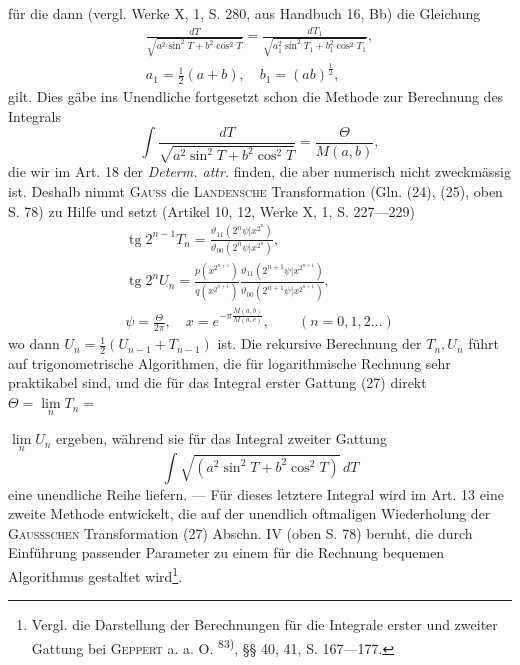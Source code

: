 \endgroup
\noindent für die dann (vergl. Werke X, 1, S. 280, aus Handbuch 16, Bb) die Gleichung
\[
\begin{gathered}
\frac{dT}{\sqrt{a^2\sin^2T+b^2\cos^2T}}=
\frac{dT_1}{\sqrt{a_1^2\sin^2T_1+b_1^2\cos^2T_1}},\\
a_1=\tfrac12(a+b),\quad b_1=(ab)^{\frac12},
\end{gathered}
\]
\noindent gilt. Dies gäbe ins Unendliche fortgesetzt schon die Methode zur Berechnung
des Integrals
\begingroup\makeatletter\tagsleft@true\let\veqno\leqno\makeatother
\begin{equation*}
\int\frac{dT}{\sqrt{a^2\sin^2T+b^2\cos^2T}}=\frac{\Theta}{M(a,b)},\tag{27}
\end{equation*}
\endgroup
\noindent die wir im Art. 18 der \textit{Determ. attr.} finden, die aber numerisch nicht zweckmässig
ist. Deshalb nimmt \textsc{Gauss} die \textsc{Landensche} Transformation (Gln. (24),
(25), oben S. 78) zu Hilfe und setzt (Artikel 10, 12, Werke X, 1, S. 227—229)
\[
\begin{gathered}
\operatorname{tg}2^{n-1}T_n=\frac{\vartheta_{11}(2^n\psi|x^{2^n})}{\vartheta_{00}(2^n\psi|x^{2^n})},\\
\operatorname{tg}2^nU_n=\frac{p(x^{2^{n+1}})}{q(x^{2^{n+1}})}
\frac{\vartheta_{11}(2^{n+1}\psi|x^{2^{n+1}})}{\vartheta_{00}(2^{n+1}\psi|x^{2^{n+1}})},\\
\psi=\frac{\Theta}{2\pi},\quad x=e^{-\pi\frac{M(a,b)}{M(a,c)}},\qquad(n=0,1,2\ldots)
\end{gathered}
\]
\noindent wo dann \(U_n=\frac12(U_{n-1}+T_{n-1})\) ist. Die rekursive Berechnung der \(T_n,U_n\) führt
auf trigonometrische Algorithmen, die für logarithmische Rechnung sehr praktikabel
sind, und die für das Integral erster Gattung (27) direkt \(\Theta=\lim\limits_n T_n=\)\par
\clearpage{}
\noindent \(\lim\limits_n U_n\) ergeben, während sie für das Integral zweiter Gattung
\[
\int\sqrt{(a^2\sin^2T+b^2\cos^2T)}\,dT
\]
\noindent eine unendliche Reihe liefern. — Für dieses letztere Integral wird im Art. 13
eine zweite Methode entwickelt, die auf der unendlich oftmaligen Wiederholung
der \textsc{Gaussschen} Transformation (27) Abschn. IV (oben S. 78) beruht,
die durch Einführung passender Parameter zu einem für die Rechnung bequemen
Algorithmus gestaltet wird\footnote{Vergl. die Darstellung der Berechnungen für die Integrale erster und zweiter Gattung bei \textsc{Geppert} a. a. O. \textsuperscript{83)}, §§ 40, 41, S. 167—177.}.

